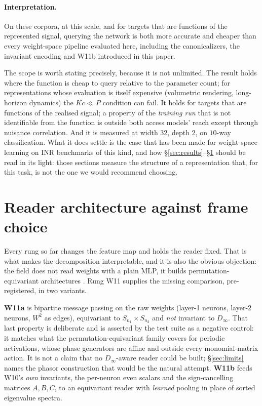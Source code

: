 \documentclass[10pt,twocolumn,letterpaper]{article}
\theoremstyle{definition}
\newcommand{\Dinf}{D_\infty}
\begin{document}
\paragraph{Interpretation.} On these corpora, at this scale, and for targets that are functions
of the represented signal, querying the network is both more accurate and cheaper than every
weight-space pipeline evaluated here, including the canonicalizers, the invariant encoding and
W11b introduced in this paper.

The scope is worth stating precisely, because it is not unlimited. The result holds where the
function is cheap to query relative to the parameter count; for representations whose evaluation is
itself expensive (volumetric rendering, long-horizon dynamics) the $Kc \ll P$ condition can fail. It
holds for targets that are functions of the realised signal; a property of the \emph{training run}
that is not identifiable from the function is outside both access models' reach except through
nuisance correlation. And it is measured at width 32, depth 2, on $10$-way classification. What it
does settle is the case that has been made for weight-space learning on INR benchmarks of this kind,
and how \S\ref{sec:results}--\S\ref{sec:w11} should be read in its light: those sections measure
the structure of a representation that, for this task, is not the one we would recommend choosing.

\section{Reader architecture against frame choice}\label{sec:w11}

Every rung so far changes the feature map and holds the reader fixed. That is what makes the
decomposition interpretable, and it is also the obvious objection: the field does not read weights
with a plain MLP, it builds permutation-equivariant architectures
\citep{navon2023dws,zhou2023nfn,lim2024gmn,kofinas2024graph,tran2024monomial}. Rung W11 supplies
the missing comparison, pre-registered, in two variants.

\textbf{W11a} is bipartite message passing on the raw weights (layer-1 neurons, layer-2 neurons, $W^2$ as edges), equivariant to $S_{n_1}\times S_{n_2}$ and \emph{not} invariant to $\Dinf$. That
last property is deliberate and is asserted by the test suite as a negative control: it matches what
the permutation-equivariant family covers for periodic activations, whose phase generators are
affine and outside every monomial-matrix action. It is not a claim that no $\Dinf$-aware reader could be built; \S\ref{sec:limits} names the phasor construction that would be the natural
attempt. \textbf{W11b} feeds W10's \emph{own} invariants, the per-neuron even scalars and the sign-cancelling matrices $A, B, C$, to an equivariant reader with
\emph{learned} pooling in place of sorted eigenvalue spectra.
\end{document}

